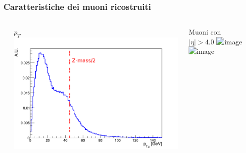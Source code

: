 \documentclass{beamer}
\begin{document}
\begin{frame}
\frametitle{Caratteristiche dei muoni ricostruiti}

\begin{columns}
\begin{column}{.09\textwidth}
\end{column}
\begin{column}{.41\textwidth}
\centering
$p_{T}$
\includegraphics[width=\textwidth]{muonPt2}
\end{column}
\begin{column}{.41\textwidth}
\centering
Muoni con $|\eta| > 4.0$ 
\includegraphics<1>[width=\textwidth]{truthOutsideDetector2}
\includegraphics<2>[width=\textwidth]{truthOutsideDetector3}
\end{column}
\begin{column}{.09\textwidth}
\end{column}
\end{columns}


\end{frame}
\end{document}
